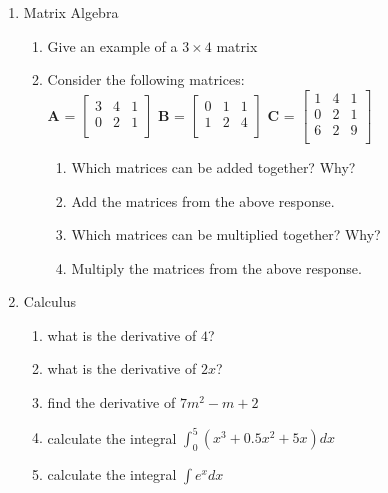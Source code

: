\documentclass[10pt]{article}
\begin{document}
\begin{enumerate}
\item Matrix Algebra
\begin{enumerate}
\item Give an example of a $3 \times 4$ matrix
\item Consider the following matrices: \\
\textbf{A} =
$
\begin{bmatrix}
  3 & 4 & 1 \\
  0 & 2 & 1 \\
\end{bmatrix}$
\textbf{B} =
$\begin{bmatrix}
  0 & 1 & 1 \\
  1 & 2 & 4 \\
\end{bmatrix}$
\textbf{C} =
$\begin{bmatrix}
  1 & 4 & 1 \\
  0 & 2 & 1 \\
  6 & 2 & 9 \\
\end{bmatrix}$ \\
\begin{enumerate}
\item Which matrices can be added together?  Why?
\item Add the matrices from the above response.  \\ \vspace{2mm}
\item Which matrices can be multiplied together?  Why?
\item Multiply the matrices from the above response. \\ \vspace{2mm}
\end{enumerate}


\end{enumerate}

\item Calculus 
\begin{enumerate}
\item what is the derivative of $4$? \\
\item what is the derivative of $2x$? \\
\item find the derivative of $7m^2-m+2$ \\
\item calculate the integral $\int_{0}^{5}  (x^3+0.5x^2+5x)dx$ \\
\item calculate the integral $\int e^x dx$ \\
\end{enumerate}



\end{enumerate} 
\end{document}
